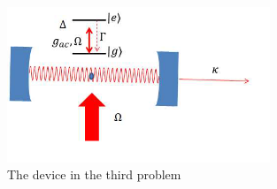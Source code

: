 \documentclass[hyperref, a4paper]{article}
\begin{document}
\paragraph{}

\begin{figure}
    \centering
    \includegraphics[width=0.7\textwidth]{fig3.png}
    \caption{The device in the third problem}
\end{figure}
\end{document}
